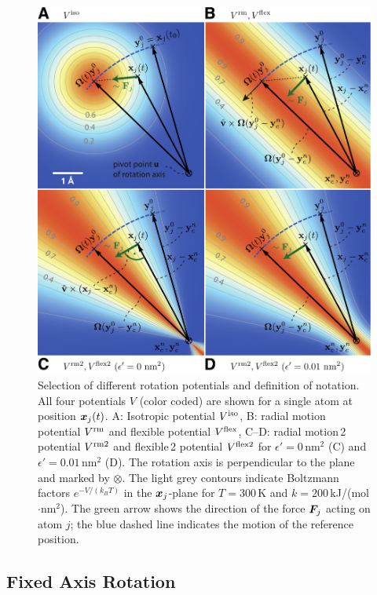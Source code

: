 \begin{figure}
\centerline{\includegraphics[width=13cm]{plots/equipotential.pdf}}
\caption{Selection of different rotation potentials and definition of notation.
All four potentials $V$ (color coded) are shown for a single atom at position
$\mbox{\boldmath ${x}$}_j(t)$.
{\sf A:} Isotropic potential $V^\mathrm{iso}$,
{\sf B:} radial motion potential $V^\mathrm{rm}$ and flexible potential
$V^\mathrm{flex}$,
{\sf C--D:} radial motion\,2 potential $V^\mathrm{rm2}$ and
flexible\,2 potential $V^\mathrm{flex2}$ for $\epsilon' = 0$\,nm$^2$ {\sf (C)}
and $\epsilon' = 0.01$\,nm$^2$ {\sf (D)}. The rotation axis is perpendicular to
the plane and marked by $\otimes$. The light grey contours indicate Boltzmann factors
$e^{-V/(k_B T)}$ in the $\mbox{\boldmath ${x}$}_j$-plane for $T=300$\,K and
$k=200$\,kJ/(mol$\cdot$nm$^2$). The green arrow shows the direction of the
force $\mbox{\boldmath ${F}$}_{\!j}$ acting on atom $j$; the blue dashed line indicates the
motion of the reference position.}
\label{fig:equipotential}
\end{figure}

\subsection{Fixed Axis Rotation}
